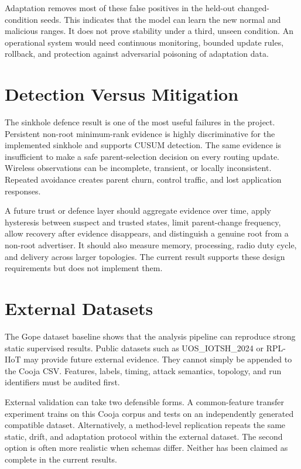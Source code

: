 Adaptation removes most of these false positives in the held-out changed-condition seeds. This indicates that the model can learn the new normal and malicious ranges. It does not prove stability under a third, unseen condition. An operational system would need continuous monitoring, bounded update rules, rollback, and protection against adversarial poisoning of adaptation data.

\section{Detection Versus Mitigation}

The sinkhole defence result is one of the most useful failures in the project. Persistent non-root minimum-rank evidence is highly discriminative for the implemented sinkhole and supports CUSUM detection. The same evidence is insufficient to make a safe parent-selection decision on every routing update. Wireless observations can be incomplete, transient, or locally inconsistent. Repeated avoidance creates parent churn, control traffic, and lost application responses.

A future trust or defence layer should aggregate evidence over time, apply hysteresis between suspect and trusted states, limit parent-change frequency, allow recovery after evidence disappears, and distinguish a genuine root from a non-root advertiser. It should also measure memory, processing, radio duty cycle, and delivery across larger topologies. The current result supports these design requirements but does not implement them.

\section{External Datasets}

The Gope dataset baseline shows that the analysis pipeline can reproduce strong static supervised results. Public datasets such as UOS\_IOTSH\_2024 or RPL-IIoT may provide future external evidence. They cannot simply be appended to the Cooja CSV. Features, labels, timing, attack semantics, topology, and run identifiers must be audited first.

External validation can take two defensible forms. A common-feature transfer experiment trains on this Cooja corpus and tests on an independently generated compatible dataset. Alternatively, a method-level replication repeats the same static, drift, and adaptation protocol within the external dataset. The second option is often more realistic when schemas differ. Neither has been claimed as complete in the current results.

